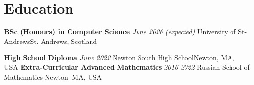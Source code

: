 \section{\textbf{Education}}

\outerlist
{
    \entrybig
    {\bf BSc (Honours) in Computer Science} {\em June 2026 (expected)}
    {University of St-Andrews}{St. Andrews, Scotland}


    \entrybig
    {\bf High School Diploma} {\em June 2022}
    {Newton South High School}{Newton, MA, USA}
    \entrybig
    {\bf Extra-Curricular Advanced Mathematics} {\em 2016-2022}
    {Russian School of Mathematics} {Newton, MA, USA}
}